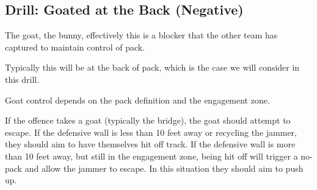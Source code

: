 \subsection*{Drill: Goated at the Back (Negative)}
\label{sec:power_jam/goated}

The goat, the bunny, effectively this is a blocker that the other team has captured to maintain control of pack. 

Typically this will be at the back of pack, which is the case we will consider in this drill. 


Goat control depends on the pack definition and the engagement zone.



If the offence takes a goat (typically the bridge), the goat should attempt to escape. If the defensive wall is less than 10 feet away or recycling the jammer, they should aim to have themselves hit off track. If the defensive wall is more than 10 feet away, but still in the engagement zone, being hit off will trigger a no-pack and allow the jammer to escape. In this situation they should aim to push up. 


